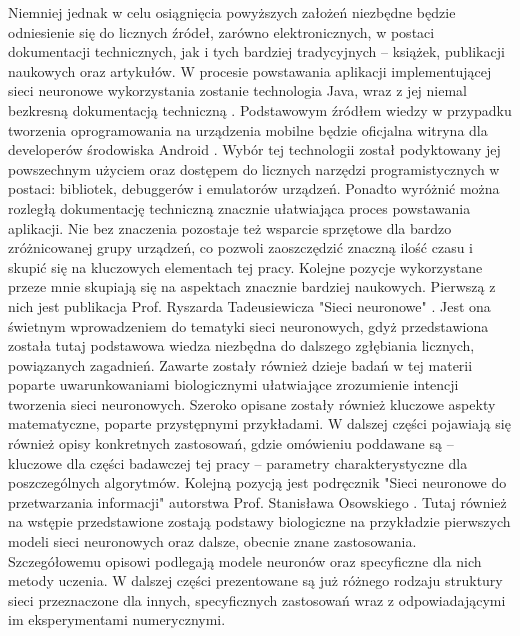 Niemniej jednak w celu osiągnięcia powyższych założeń niezbędne będzie odniesienie się do licznych źródeł, zarówno elektronicznych, w postaci dokumentacji technicznych, jak i tych bardziej tradycyjnych -- książek, publikacji naukowych oraz artykułów. W procesie powstawania aplikacji implementującej sieci neuronowe wykorzystania zostanie technologia Java, wraz z jej niemal bezkresną dokumentacją techniczną \cite{java}. Podstawowym źródłem wiedzy w przypadku tworzenia oprogramowania na urządzenia mobilne będzie oficjalna witryna dla developerów środowiska Android \cite{android}. Wybór tej technologii został podyktowany jej powszechnym użyciem oraz dostępem do licznych narzędzi programistycznych w postaci: bibliotek, debuggerów i emulatorów urządzeń. Ponadto wyróżnić można rozległą dokumentację techniczną znacznie ułatwiająca proces powstawania aplikacji. Nie bez znaczenia pozostaje też wsparcie sprzętowe dla bardzo zróżnicowanej grupy urządzeń, co pozwoli zaoszczędzić znaczną ilość czasu i skupić się na kluczowych elementach tej pracy. Kolejne pozycje wykorzystane przeze mnie skupiają się na aspektach znacznie bardziej naukowych. Pierwszą z nich jest publikacja Prof. Ryszarda Tadeusiewicza "Sieci neuronowe" \cite{Tad93}. Jest ona świetnym wprowadzeniem do tematyki sieci neuronowych, gdyż przedstawiona została tutaj podstawowa wiedza niezbędna do dalszego zgłębiania licznych, powiązanych zagadnień. Zawarte zostały również dzieje badań w tej materii poparte uwarunkowaniami biologicznymi ułatwiające zrozumienie intencji tworzenia sieci neuronowych. Szeroko opisane zostały również kluczowe aspekty matematyczne, poparte przystępnymi przykładami. W dalszej części pojawiają się również opisy konkretnych zastosowań, gdzie omówieniu poddawane są -- kluczowe dla części badawczej tej pracy -- parametry charakterystyczne dla poszczególnych algorytmów. Kolejną pozycją jest podręcznik "Sieci neuronowe do przetwarzania informacji" autorstwa Prof. Stanisława Osowskiego \cite{Oso06}. Tutaj również na wstępie przedstawione zostają podstawy biologiczne na przykładzie pierwszych modeli sieci neuronowych oraz dalsze, obecnie znane zastosowania. Szczegółowemu opisowi podlegają modele neuronów oraz specyficzne dla nich metody uczenia. W dalszej części prezentowane są już różnego rodzaju struktury sieci przeznaczone dla innych, specyficznych zastosowań wraz z odpowiadającymi im eksperymentami numerycznymi.
